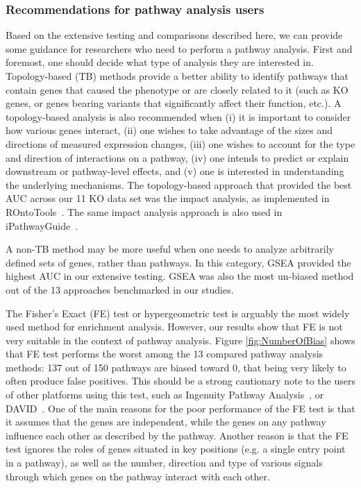 \subsubsection{Recommendations for pathway analysis users}
Based on the extensive testing and comparisons described here, we can provide some guidance for researchers who need to perform a pathway analysis. First and foremost, one should decide what type of analysis they are interested in. Topology-based (TB) methods  provide a better ability to identify pathways that contain genes that caused the phenotype or are closely related to it (such as KO genes, or genes bearing variants that significantly affect their function, etc.). A topology-based analysis is also recommended when (i) it is important to consider how various genes interact, (ii) one wishes to take advantage of the sizes and directions of measured expression changes, (iii) one wishes to account for the type and direction of interactions on a pathway, (iv) one intends to predict or explain downstream or pathway-level effects, and (v) one is interested in understanding the underlying mechanisms. The topology-based approach that  provided the best AUC across our 11 KO data set was the impact analysis, as implemented in ROntoTools~\cite{ROntoTools1.2.0}. The same impact analysis approach is also used in  iPathwayGuide~\cite{ahsan2017identifying,Pathway-GuideSoftware}.

A non-TB method may be more useful when one needs to analyze arbitrarily defined sets of genes, rather than pathways. In this category, GSEA provided the highest AUC in our extensive testing. GSEA was also the most un-biased method out of the 13 approaches benchmarked in our studies. 

The Fisher's Exact (FE) test or hypergeometric test is arguably the most widely  used method for enrichment analysis. However,  our results show that FE is not very suitable in the context of pathway analysis. Figure \ref{fig:NumberOfBias} shows that FE test performs the worst among the 13 compared pathway analysis methods:  137 out of 150 pathways are biased toward 0, that being very likely to often produce false positives. This  should be a strong cautionary note to the users of other platforms using this test, such as Ingenuity Pathway Analysis~\cite{kramer2013causal}, or DAVID~\cite{huang2008systematic}.
One of the main reasons for the poor performance of the FE test is that it assumes that the genes are independent, while the genes on any pathway influence each other as described by the pathway. Another reason is that the FE test ignores the roles of genes situated in key positions (e.g. a single entry point in a pathway), as well as the number, direction and type of various signals through which genes on the pathway interact with each other.
